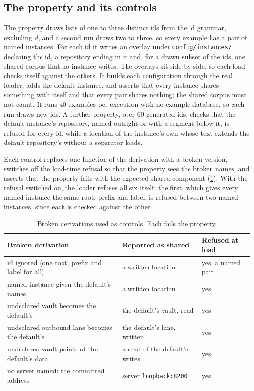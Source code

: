\documentclass[11pt]{article}
\theoremstyle{plain}
\theoremstyle{definition}
\theoremstyle{remark}
\begin{document}
\subsection{The property and its controls}
The property draws lists of one to three distinct ids from the id grammar, excluding $d$, and a
second run draws two to three, so every example has a pair of named instances. For each id it
writes an overlay under \texttt{config/instances/} declaring the id, a repository ending in it and,
for a drawn subset of the ids, one shared corpus that no instance writes. The overlays sit side by
side, so each load checks itself against the others. It builds each configuration through the real
loader, adds the default instance, and asserts that every instance shares something with itself and
that every pair shares nothing; the shared corpus must not count. It runs 40 examples per execution
with no example database, so each run draws new ids. A further property, over 60 generated ids,
checks that the default instance's repository, named outright or with a segment below it, is
refused for every id, while a location of the instance's own whose text extends the default
repository's without a separator loads.

Each control replaces one function of the derivation with a broken version, switches off the
load-time refusal so that the property sees the broken names, and asserts that the property fails
with the expected shared component (\cref{tab:controls}). With the refusal switched on, the loader
refuses all six itself; the first, which gives every named instance the same root, prefix and label,
is refused between two named instances, since each is checked against the other.

\begin{table}[ht]
\centering\small
\caption{Broken derivations used as controls. Each fails the property.}\label{tab:controls}
\begin{tabular}{@{}lll@{}}
\toprule
Broken derivation & Reported as shared & Refused at load \\
\midrule
id ignored (one root, prefix and label for all) & a written location & yes, a named pair \\
named instance given the default's names & a written location & yes \\
undeclared vault becomes the default's & the default's vault, read & yes \\
undeclared outbound lane becomes the default's & the default's lane, written & yes \\
undeclared vault points at the default's data & a read of the default's writes & yes \\
no server named: the committed address & server \texttt{loopback:8200} & yes \\
\bottomrule
\end{tabular}
\end{table}
\end{document}
